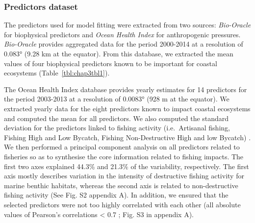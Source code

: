 \begin{refsection}
\hypertarget{predictors-dataset}{%
\subsubsection{Predictors dataset}\label{predictors-dataset}}

The predictors used for model fitting were extracted from two sources:
\emph{Bio-Oracle} \autocite{Assis_2018} for biophysical predictors and
\emph{Ocean Health Index} \autocite{Halpern_2019} for anthropogenic
pressures. \emph{Bio-Oracle} provides aggregated data for the period
2000-2014 at a resolution of 0.083° (9.28 km at the equator). From this
database, we extracted the mean values of four biophysical predictors
known to be important for coastal ecosystems
(Table~\ref{tbl:chap3tbl1}).

The Ocean Health Index database provides yearly estimates for 14
predictors for the period 2003-2013 at a resolution of 0.0083° (928 m at
the equator). We extracted yearly data for the eight predictors known to
impact coastal ecosystems and computed the mean for all predictors. We
also computed the standard deviation for the predictors linked to
fishing activity (i.e.~Artisanal fishing, Fishing High and Low Bycatch,
Fishing Non-Destructive High and low Bycatch) . We then performed a
principal component analysis on all predictors related to fisheries so
as to synthesise the core information related to fishing impacts. The
first two axes explained 44.3\% and 21.3\% of the variability,
respectively. The first axis mostly describes variation in the intensity
of destructive fishing activity for marine benthic habitats, whereas the
second axis is related to non-destructive fishing activity (See Fig. S2
appendix A). In addition, we ensured that the selected predictors were
not too highly correlated with each other (all absolute values of
Pearson's correlations \textless{} 0.7 ; Fig. S3 in appendix A).

\clearpage


\end{refsection}
